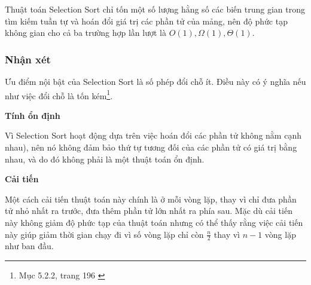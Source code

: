 Thuật toán Selection Sort chỉ tốn một số lượng hằng số các biến trung gian trong tìm kiếm tuần tự và hoán đổi giá trị các phần tử của mảng, nên độ phức tạp không gian cho cả ba trường hợp lần lượt là $O(1), \Omega(1), \Theta(1)$.

 

\subsubsection{Nhận xét}

Ưu điểm nội bật của Selection Sort là số phép đổi chỗ ít. Điều này có ý nghĩa nếu như việc đổi chỗ là tốn kém\footnote{Mục 5.2.2, trang 196 \cite{dsa_nghia_2013}}. 


\textbf{Tính ổn định} 

Vì Selection Sort hoạt động dựa trên việc hoán đổi các phần tử không nằm cạnh nhau), nên nó không đảm bảo thứ tự tương đối của các phần tử có giá trị bằng nhau, và do đó không phải là một thuật toán ổn định.


\textbf{Cải tiến} 

Một cách cải tiến thuật toán này chính là ở mỗi vòng lặp, thay vì chỉ đưa phần tử nhỏ nhất ra trước, đưa thêm phần tử lớn nhất ra phía sau. Mặc dù cải tiến này không giảm độ phức tạp của thuật toán nhưng có thể thấy rằng việc cải tiến này giúp giảm thời gian chạy đi vì số vòng lặp chỉ còn $\frac{n}{2}$ thay vì $n - 1$ vòng lặp như ban đầu.